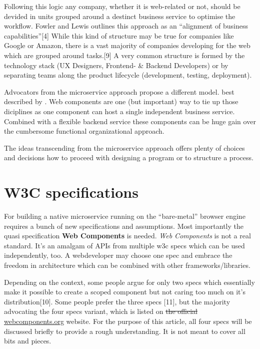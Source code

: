 \documentclass[]{assets/latex/ieee}
\begin{document}
Following this logic any company, whether it is web-related or not,
should be devided in units grouped around a destinct business service to
optimise the workflow. Fowler and Lewis outlines this approach as an
``alignment of business capabilities''{[}4{]} While this kind of
structure may be true for companies like Google or Amazon, there is a
vast majority of companies developing for the web which are grouped
around tasks.{[}9{]} A very common structure is formed by the technology
stack (UX Designers, Frontend- \& Backend Developers) or by separating
teams along the product lifecycle (development, testing, deployment).

Advocators from the microservice approach propose a different model.
best described by . Web components are one (but important) way to tie up
those diciplines as one component can host a single independent business
service. Combined with a flexible backend service these components can
be huge gain over the cumbersome functional organizational approach.

The ideas transcending from the microservice approach offers plenty of
choices and decisions how to proceed with designing a program or to
structure a process.

\section{W3C specifications}\label{w3c-specifications}

For building a native microservice running on the ``bare-metal'' browser
engine requires a bunch of new specifications and assumptions. Most
importantly the quasi specification \textbf{Web Components} is needed.
\emph{Web Components} is not a real standard. It's an amalgam of APIs
from multiple w3c specs which can be used independently, too. A
webdeveloper may choose one spec and embrace the freedom in architecture
which can be combined with other frameworks/libraries.

Depending on the context, some people argue for only two specs which
essentially make it possible to create a scoped component but not caring
too much on it's distribution{[}10{]}. Some people prefer the three
specs {[}11{]}, but the majority advocating the four specs variant,
which is listed on \sout{the official}
\href{http://webcomponents.org}{webcomponents.org} website. For the
purpose of this article, all four specs will be discussed briefly to
provide a rough understanding. It is not meant to cover all bits and
pieces.
\end{document}
